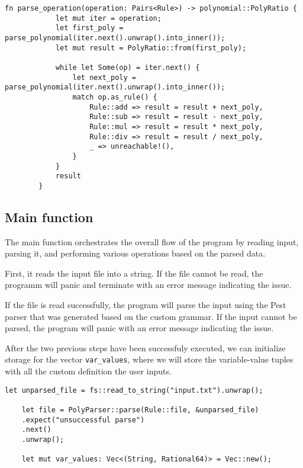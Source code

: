     \begin{lstlisting}[caption={The implementation of the \texttt{parse\_operation()} function}, label={lst:parse-operation}]
        fn parse_operation(operation: Pairs<Rule>) -> polynomial::PolyRatio {
            let mut iter = operation;
            let first_poly = parse_polynomial(iter.next().unwrap().into_inner());
            let mut result = PolyRatio::from(first_poly);
        
            while let Some(op) = iter.next() {
                let next_poly = parse_polynomial(iter.next().unwrap().into_inner());
                match op.as_rule() {
                    Rule::add => result = result + next_poly,
                    Rule::sub => result = result - next_poly,
                    Rule::mul => result = result * next_poly,
                    Rule::div => result = result / next_poly,
                    _ => unreachable!(),
                }
            }
            result
        }        
    \end{lstlisting}

\subsection{Main function}\label{subsec:main-function}

The main function orchestrates the overall flow of the program by reading input, parsing it, and performing various operations based on the parsed data.

First, it reads the input file into a string. If the file cannot be read, the programm will panic and terminate with an error message indicating the issue.

If the file is read successfully, the program will parse the input using the Pest parser that was generated based on the custom grammar. If the input cannot be parsed, the program will panic with an error message indicating the issue.

After the two previous steps have been successfuly executed, we can initialize storage for the vector \verb|var_values|, where we will store the variable-value tuples with all the custom definition the user inputs.

\begin{lstlisting}[caption={Reading and parsing user input, and defining storage for custom variable values}, label={lst:reading-parsing-input}]
    let unparsed_file = fs::read_to_string("input.txt").unwrap();

    let file = PolyParser::parse(Rule::file, &unparsed_file)
    .expect("unsuccessful parse")
    .next()
    .unwrap();

    let mut var_values: Vec<(String, Rational64)> = Vec::new();
\end{lstlisting}

